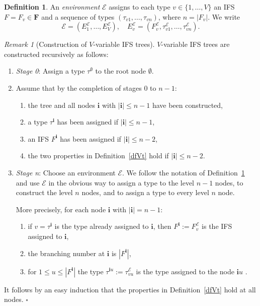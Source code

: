 \documentclass[a4paper]{amsart}
\theoremstyle{plain}
\theoremstyle{definition}
\newtheorem{definition}[theorem]{Definition}%
\theoremstyle{remark}
\newtheorem{remark}[theorem]{Remark}
\begin{document}
\begin{definition} \label{dfenv}  An \emph{environment} $ \mathcal{E}$ assigns to each type $v \in \{1,\dots, V \} $ an  IFS $ F= F_v \in \boldsymbol{F} $ and a sequence of types $( \tau_{v1}, \dots, \tau_{vn})$, where $ n = |F_v| $.  We write 
\[
\mathcal{E} = (E^{\mathcal{E}}_1,\dots, E^{\mathcal{E}}_V),\quad   E^{\mathcal{E}}_v 
       = (F^{\mathcal{E}}_v,  \tau^{\mathcal{E}}_{v1}, \dots,  \tau^{\mathcal{E}}_{v n }). 
\]
\end{definition} 
 
 
\begin{remark}[Construction of $ V $-variable IFS trees]  
 $ V $-variable IFS trees are constructed recursively  as follows:
\begin{enumerate}

\item \emph{Stage 0}:  Assign a type $ \tau^\emptyset $ to the root node $ \emptyset $.
 
\item Assume that by the completion of stages $ 0$  to $  n-1$: 
\begin{enumerate}
\item the tree and all nodes $ \boldsymbol{i} $ with  $ | \boldsymbol{i} | \leq n-1 $ have been constructed,
\item a type $ \tau ^ { \boldsymbol{i} } $ has been assigned if  $ | \boldsymbol{i} | \leq n-1 $, 
\item an IFS $F ^ { \boldsymbol{i} } $ has been assigned if  $ | \boldsymbol{i} | \leq n-2 $, 
\item  the two properties in Definition~\ref{dfVt}  hold if  $ | \boldsymbol{i} | \leq n-2 $.
\end{enumerate}  

\item   \emph{Stage n}:  Choose an environment $ \mathcal{E} $.  We follow the notation of Definition~\ref{dfenv}  and use $ \mathcal{E}  $ in the obvious way to assign a type to the level $ n-1 $ nodes, to construct the level $ n $ nodes, and to assign a type to every level $ n $ node.  
 
 More precisely, for each node $ \boldsymbol{i} $ with  $ | \boldsymbol{i} | = n -1 $:
\begin{enumerate}
\item if $ v =\tau ^ {\boldsymbol{i} }  $ is the type already assigned to $ \boldsymbol{i} $, then   $ F^{\boldsymbol{i}} := F^{\mathcal{E} }_v$   is the IFS assigned to $ \boldsymbol{i} $, 
\item the branching number at $ \boldsymbol{i} $ is $ |F^{\boldsymbol{i}}| $,
\item for $ 1\leq u \leq |F^{\boldsymbol{i}}| $ the type $\tau ^{\boldsymbol{i} u } := \tau^{\mathcal{E}}_{vu} $ is the type assigned to the  node $ \boldsymbol{i} u $ .
\end{enumerate} 
\end{enumerate} 

It follows by an easy induction that the properties in  Definition~\ref{dfVt} hold at all nodes.
\hfill $\square$  \end{remark} 
\end{document}
